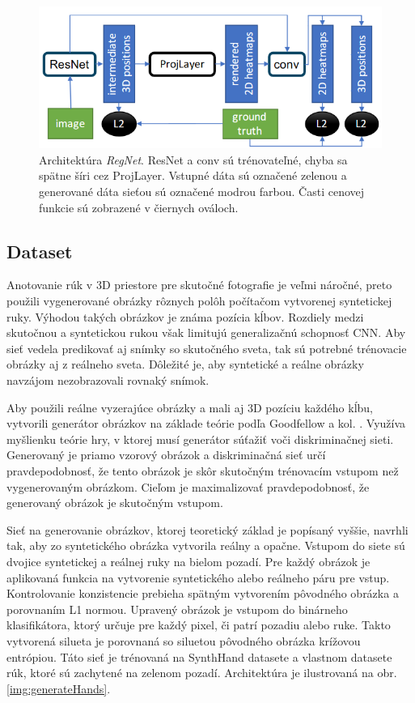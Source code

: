 \begin{figure}[H]
	\begin{center}
		\includegraphics[height=\imageHeight]{images/43GANerated.png}
		\caption{Architektúra {\it RegNet}\cite{GANeratedHands_CVPR2018}. ResNet a conv sú trénovateľné, chyba sa spätne šíri cez ProjLayer. Vstupné dáta sú označené zelenou a generované dáta sieťou sú označené modrou farbou. Časti cenovej funkcie sú zobrazené v čiernych ováloch.}
		\label{img:43GANerated}
	\end{center}
\end{figure}

\subsection{Dataset}
Anotovanie rúk v 3D priestore pre skutočné fotografie je veľmi náročné, preto použili vygenerované obrázky rôznych polôh počítačom vytvorenej syntetickej ruky. Výhodou takých obrázkov je známa pozícia kĺbov. Rozdiely medzi skutočnou a syntetickou rukou však limitujú generalizačnú schopnosť CNN. Aby sieť vedela predikovať aj snímky so skutočného sveta, tak sú potrebné trénovacie obrázky aj z reálneho sveta. Dôležité je, aby syntetické a reálne obrázky navzájom nezobrazovali rovnaký snímok.

Aby použili reálne vyzerajúce obrázky a mali aj 3D pozíciu každého kĺbu, vytvorili generátor obrázkov na základe teórie podľa Goodfellow a kol. \cite{Goodfellow-et-al-2016}. Využíva myšlienku teórie hry, v ktorej musí generátor súťažiť voči diskriminačnej sieti. Generovaný je priamo vzorový obrázok a diskriminačná sieť určí pravdepodobnosť, že tento obrázok je skôr skutočným trénovacím vstupom než vygenerovaným obrázkom. Cieľom je maximalizovať pravdepodobnosť, že generovaný obrázok je skutočným vstupom.

Sieť na generovanie obrázkov, ktorej teoretický základ je popísaný vyššie, navrhli \cite{GANeratedHands_CVPR2018} tak, aby zo syntetického obrázka vytvorila reálny a opačne. Vstupom do siete sú dvojice syntetickej a reálnej ruky na bielom pozadí. Pre každý obrázok je aplikovaná funkcia na vytvorenie syntetického alebo reálneho páru pre vstup. Kontrolovanie konzistencie prebieha spätným vytvorením pôvodného obrázka a porovnaním L1 normou. Upravený obrázok je vstupom do binárneho klasifikátora, ktorý určuje pre každý pixel, či patrí pozadiu alebo ruke. Takto vytvorená silueta je porovnaná so siluetou pôvodného obrázka krížovou entrópiou. Táto sieť je trénovaná na SynthHand \cite{DBLP:journals/corr/MuellerMS0CT17} datasete a vlastnom datasete rúk, ktoré sú zachytené na zelenom pozadí. Architektúra je ilustrovaná na obr. \ref{img:generateHands}.

